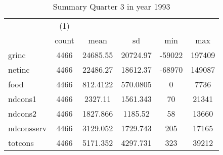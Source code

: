\begin{table}[htbp]\centering
\def\sym#1{\ifmmode^{#1}\else\(^{#1}\)\fi}
\caption{Summary Quarter 3 in year 1993 \label{sum\_Q3\_y1993}}
\begin{tabular}{l*{1}{ccccc}}
\hline\hline
            &\multicolumn{1}{c}{(1)}&            &            &            &            \\
            &       count&        mean&          sd&         min&         max\\
\hline
grinc       &        4466&    24685.55&    20724.97&      -59022&      197409\\
netinc      &        4466&    22486.27&    18612.37&      -68970&      149087\\
food        &        4466&    812.4122&    570.0805&           0&        7736\\
ndcons1     &        4466&     2327.11&    1561.343&          70&       21341\\
ndcons2     &        4466&    1827.866&     1185.52&          58&       13660\\
ndconsserv  &        4466&    3129.052&    1729.743&         205&       17165\\
totcons     &        4466&    5171.352&    4297.731&         323&       39212\\
\hline\hline
\end{tabular}
\end{table}
